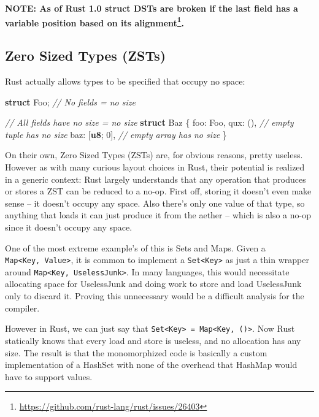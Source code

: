 \documentclass[a4paper,]{book}
\newenvironment{Shaded}{\begin{snugshade}}{\end{snugshade}}
\newcommand{\KeywordTok}[1]{\textcolor[rgb]{0.13,0.29,0.53}{\textbf{{#1}}}}
\newcommand{\DecValTok}[1]{\textcolor[rgb]{0.00,0.00,0.81}{{#1}}}
\newcommand{\CommentTok}[1]{\textcolor[rgb]{0.56,0.35,0.01}{\textit{{#1}}}}
\newcommand{\NormalTok}[1]{{#1}}
\renewcommand{\href}[2]{#2\footnote{\url{#1}}}
\begin{document}
\textbf{NOTE: \href{https://github.com/rust-lang/rust/issues/26403}{As
of Rust 1.0 struct DSTs are broken if the last field has a variable
position based on its alignment}.}

\subsection{Zero Sized Types (ZSTs)}\label{zero-sized-types-zsts}

Rust actually allows types to be specified that occupy no space:

\begin{Shaded}
\begin{Highlighting}[]
\KeywordTok{struct} \NormalTok{Foo; }\CommentTok{// No fields = no size}

\CommentTok{// All fields have no size = no size}
\KeywordTok{struct} \NormalTok{Baz \{}
    \NormalTok{foo: Foo,}
    \NormalTok{qux: (),      }\CommentTok{// empty tuple has no size}
    \NormalTok{baz: [}\KeywordTok{u8}\NormalTok{; }\DecValTok{0}\NormalTok{], }\CommentTok{// empty array has no size}
\NormalTok{\}}
\end{Highlighting}
\end{Shaded}

On their own, Zero Sized Types (ZSTs) are, for obvious reasons, pretty
useless. However as with many curious layout choices in Rust, their
potential is realized in a generic context: Rust largely understands
that any operation that produces or stores a ZST can be reduced to a
no-op. First off, storing it doesn't even make sense -- it doesn't
occupy any space. Also there's only one value of that type, so anything
that loads it can just produce it from the aether -- which is also a
no-op since it doesn't occupy any space.

One of the most extreme example's of this is Sets and Maps. Given a
\texttt{Map\textless{}Key,\ Value\textgreater{}}, it is common to
implement a \texttt{Set\textless{}Key\textgreater{}} as just a thin
wrapper around \texttt{Map\textless{}Key,\ UselessJunk\textgreater{}}.
In many languages, this would necessitate allocating space for
UselessJunk and doing work to store and load UselessJunk only to discard
it. Proving this unnecessary would be a difficult analysis for the
compiler.

However in Rust, we can just say that
\texttt{Set\textless{}Key\textgreater{}\ =\ Map\textless{}Key,\ ()\textgreater{}}.
Now Rust statically knows that every load and store is useless, and no
allocation has any size. The result is that the monomorphized code is
basically a custom implementation of a HashSet with none of the overhead
that HashMap would have to support values.
\end{document}
